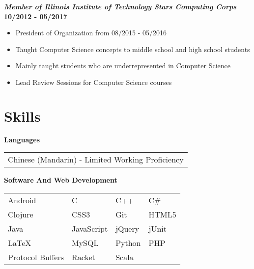 \documentclass[margin=1in, 10pt]{res}
\begin{document}
\begin{resume}
	\textbf{\textit{Member of Illinois Institute of Technology Stars Computing
	Corps}}
	\hfill {\bf 10/2012 - 05/2017}
	\begin{itemize}
  \setlength\itemsep{0em}
	  \item President of Organization from 08/2015 - 05/2016
	  \item Taught Computer Science concepts to middle school and high school students  
	  \item Mainly taught students who are underrepresented in Computer Science 
	  \item Lead Review Sessions for Computer Science courses 
	\end{itemize}
	
\section{Skills}
\textbf{Languages} \\ 
	\begin{tabular}{ l }
		Chinese (Mandarin) - Limited Working Proficiency
	\end{tabular}
	
	\vspace{1pt}
\textbf{Software And Web Development} \\
	\begin{tabular}{  l    l    l    l  }
		Android	           &   C 	     			&    C++ 			&   C\# 	\\ 
		Clojure 			& 	CSS3 	 		& 	Git	 			& 	HTML5  \\
	     Java  				& 	JavaScript 		&	jQuery            &   jUnit  	 \\
		LaTeX   			&   MySQL 			&	Python       	&	PHP  	 \\	   
  	 	Protocol Buffers   	& 	Racket         	&	Scala			&				
	\end{tabular}
\end{resume}
\end{document}
